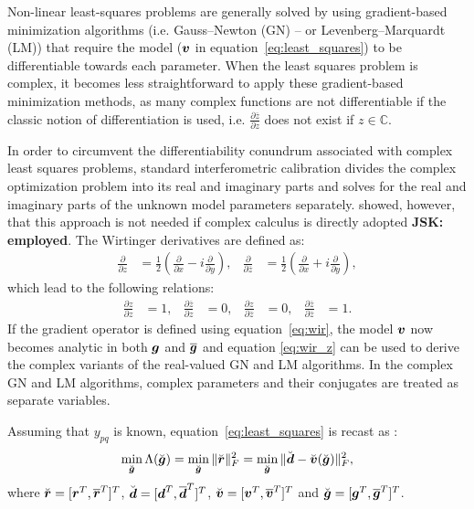 \documentclass[useAMS,usenatbib]{mn2e}
\newcommand{\br}{\bmath{r}}
\newcommand{\bg}{\bmath{g}}
\newcommand{\bd}{\bmath{d}}
\newcommand{\bv}{\bmath{v}}
\newcommand{\conj}[1]{\overline{#1}}
\begin{document}
Non-linear least-squares problems are generally solved by using gradient-based minimization algorithms (i.e. Gauss--Newton (GN) -- or Levenberg--Marquardt (LM)) that require the model ($\bv$ in equation~\ref{eq:least_squares}) to be differentiable towards each parameter. 
When the least squares problem is complex, it becomes less straightforward to apply these gradient-based minimization methods, as
many complex functions are not differentiable if the classic notion of differentiation is used, i.e. $\frac{\partial \conj{z}}{\partial z}$ does not exist if $z \in \mathbb{C}$.

In order to circumvent the differentiability conundrum associated with complex least squares problems, standard interferometric calibration divides the complex optimization problem into its real and imaginary parts and solves for the real and imaginary parts of the unknown model parameters separately. \citet{Smirnov2015} showed, however, that this approach is not needed if complex calculus \citep{Wirtinger1927} is directly adopted {\bf JSK: employed}. The Wirtinger derivatives are defined as:
\begin{align}
\label{eq:wir}
\frac{\partial}{\partial z} &= \frac{1}{2}\left ( \frac{\partial}{\partial x} -  i \frac{\partial}{\partial y} \right ),&\frac{\partial}{\partial \conj{z}} &= \frac{1}{2}\left ( \frac{\partial}{\partial x} +  i \frac{\partial}{\partial y} \right ), 
\end{align}
which lead to the following relations:
\begin{align}
\label{eq:wir_z}
\frac{\partial z}{\partial z} & = 1, & \frac{\partial \conj{z}}{\partial z}&=0, & \frac{\partial z}{\partial \conj{z}} & = 0, & \frac{\partial \conj{z}}{\partial \conj{z}}&=1.
\end{align}
If the gradient operator is defined using equation~\ref{eq:wir}, the model $\bv$ now becomes analytic in both $\bg$ and $\conj{\bg}$ and equation \ref{eq:wir_z} can be used to derive the complex variants of the real-valued GN and LM algorithms. In the complex GN and LM algorithms, complex parameters and their conjugates are treated as separate variables.

Assuming that $y_{pq}$ is known, equation~\ref{eq:least_squares} is recast as \citep{Smirnov2015}:
\begin{equation}
\label{eq:least_squares_augmented}
\min_{\breve{\bg}} \Lambda(\breve{\bg}) = \min_{\breve{\bg}} \|\breve{\br}\|_F^2 = \min_{\breve{\bg}} \|\breve{\bd} - \breve{\bv}(\breve{\bg})\|_F^2, 
\end{equation} 
where $\breve{\br} = [\br^T,\conj{\br}^T]^T$, $\breve{\bd} = [\bd^T,\conj{\bd}^T]^T$, $\breve{\bv} = [\bv^T,\conj{\bv}^T]^T$ and $\breve{\bg} = [\bg^T,\conj{\bg}^T]^T$.
\end{document}
